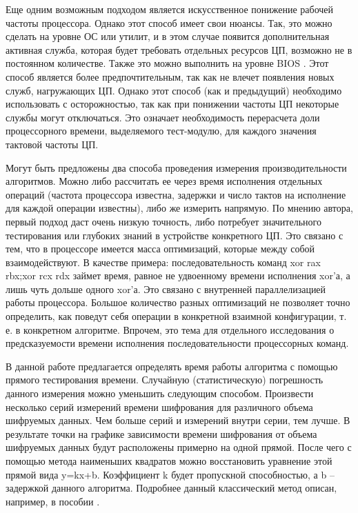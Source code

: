 Еще одним возможным подходом является искусственное понижение рабочей частоты процессора. Однако этот способ имеет свои нюансы. Так, это можно сделать на уровне ОС или утилит, и в этом случае появится дополнительная активная служба, которая будет требовать отдельных ресурсов ЦП, возможно не в постоянном количестве. Также это можно выполнить на уровне BIOS \cite{src63}. Этот способ является более предпочтительным, так как не влечет появления новых служб, нагружающих ЦП. Однако этот способ (как и предыдущий) необходимо использовать с осторожностью, так как при понижении частоты ЦП некоторые службы могут отключаться. Это означает необходимость перерасчета доли процессорного времени, выделяемого тест-модулю, для каждого значения тактовой частоты ЦП.

Могут быть предложены два способа проведения измерения производительности алгоритмов. Можно либо рассчитать ее через время исполнения отдельных операций (частота процессора известна, задержки и число тактов на исполнение для каждой операции известны), либо же измерить напрямую. По мнению автора, первый подход даст очень низкую точность, либо потребует значительного тестирования или глубоких знаний в устройстве конкретного ЦП. Это связано с тем, что в процессоре имеется масса оптимизаций, которые между собой взаимодействуют. В качестве примера: последовательность команд xor rax rbx;xor rcx rdx займет время, равное не удвоенному времени исполнения xor’а, а лишь чуть дольше одного xor’а. Это связано с внутренней параллелизацией работы процессора. Большое количество разных оптимизаций не позволяет точно определить, как поведут себя операции в конкретной взаимной конфигурации, т. е. в конкретном алгоритме. Впрочем, это тема для отдельного исследования о предсказуемости времени исполнения последовательности процессорных команд.

В данной работе предлагается определять время работы алгоритма с помощью прямого тестирования времени. Случайную (статистическую) погрешность данного измерения можно уменьшить следующим способом. Произвести несколько серий измерений времени шифрования для различного объема шифруемых данных. Чем больше серий и измерений внутри серии, тем лучше. В результате точки на графике зависимости времени шифрования от объема шифруемых данных будут расположены примерно на одной прямой. После чего с помощью метода наименьших квадратов можно восстановить уравнение этой прямой вида y=kx+b. Коэффициент k будет пропускной способностью, а b – задержкой данного алгоритма. Подробнее данный классический метод описан, например, в пособии \cite{src64}.

